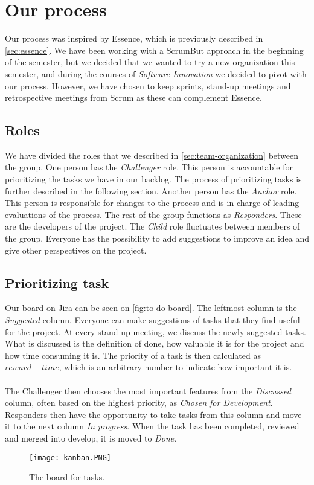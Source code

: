 \section{Our process}
Our process was inspired by Essence, which is previously described in \autoref{sec:essence}.
We have been working with a ScrumBut approach in the beginning of the semester, but we decided that we wanted to try a new organization this semester, and during the courses of \textit{Software Innovation} we decided to pivot with our process.
However, we have chosen to keep sprints, stand-up meetings and retrospective meetings from Scrum as these can complement Essence.

\subsection{Roles}
We have divided the roles that we described in \autoref{sec:team-organization} between the group.
One person has the \textit{Challenger} role.
This person is accountable for prioritizing the tasks we have in our backlog.
The process of prioritizing tasks is further described in the following section.
Another person has the \textit{Anchor} role.
This person is responsible for changes to the process and is in charge of leading evaluations of the process.
The rest of the group functions as \textit{Responders}.
These are the developers of the project.
The \textit{Child} role fluctuates between members of the group.
Everyone has the possibility to add suggestions to improve an idea and give other perspectives on the project.

\subsection{Prioritizing task}
Our board on Jira can be seen on \autoref{fig:to-do-board}.
The leftmost column is the \textit{Suggested} column.
Everyone can make suggestions of tasks that they find useful for the project.
At every stand up meeting, we discuss the newly suggested tasks.
What is discussed is the definition of done, how valuable it is for the project and how time consuming it is.
The priority of a task is then calculated as $reward - time$, which is an arbitrary number to indicate how important it is.
\\\\
The Challenger then chooses the most important features from the \textit{Discussed} column, often based on the highest priority, as \textit{Chosen for Development}.
Responders then have the opportunity to take tasks from this column and move it to the next column \textit{In progress}.
When the task has been completed, reviewed and merged into develop, it is moved to \textit{Done}.
\begin{figure}[H]
    \centering
    \texttt{[image: kanban.PNG]}
    \caption{The board for tasks.}
    \label{fig:to-do-board}
\end{figure}


